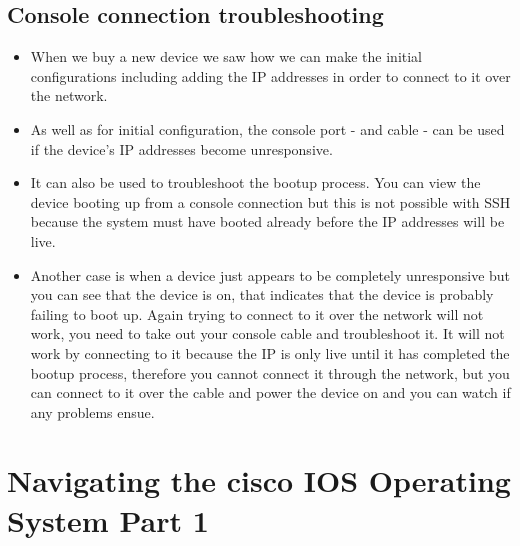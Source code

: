 \subsection{Console connection troubleshooting}
\begin{itemize}
    \item When we buy a new device we saw how we can make the initial configurations including adding the IP addresses in order to connect to it over the network.
    \item As well as for initial configuration, the console port - and cable - can be used if the device's IP addresses become unresponsive.
    \item It can also be used to troubleshoot the bootup process. You can view the device booting up from a console connection but this is not possible with SSH because the system must have booted already before the IP addresses will be live.
    \item Another case is when a device just appears to be completely unresponsive but you can see that the device is on, that indicates that the device is probably failing to boot up. Again trying to connect to it over the network will not work, you need to take out your console cable and troubleshoot it. It will not work by connecting to it because the IP is only live until it has completed the bootup process, therefore you cannot connect it through the network, but you can connect to it over the cable and power the device on and you can watch if any problems ensue.
\end{itemize}


\section{Navigating the cisco IOS Operating System Part 1}
